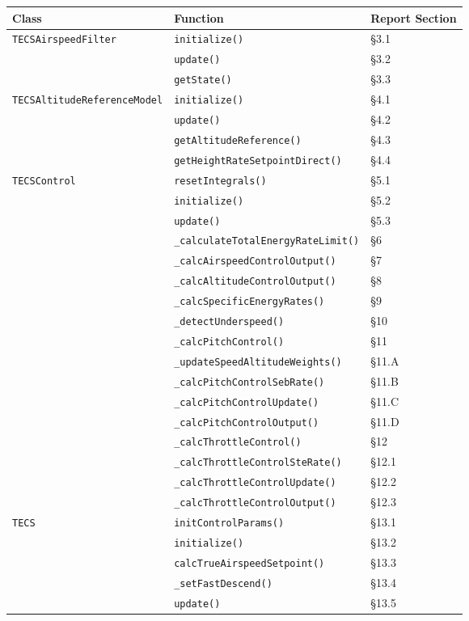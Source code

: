 \documentclass[12pt,a4paper]{article}
\begin{document}
\begin{center}
\begin{tabular}{lll}
\toprule
Class & Function & Report Section \\
\midrule
\texttt{TECSAirspeedFilter} & \texttt{initialize()} & \S3.1 \\
 & \texttt{update()} & \S3.2 \\
 & \texttt{getState()} & \S3.3 \\
\midrule
\texttt{TECSAltitudeReferenceModel} & \texttt{initialize()} & \S4.1 \\
 & \texttt{update()} & \S4.2 \\
 & \texttt{getAltitudeReference()} & \S4.3 \\
 & \texttt{getHeightRateSetpointDirect()} & \S4.4 \\
\midrule
\texttt{TECSControl} & \texttt{resetIntegrals()} & \S5.1 \\
 & \texttt{initialize()} & \S5.2 \\
 & \texttt{update()} & \S5.3 \\
 & \texttt{\_calculateTotalEnergyRateLimit()} & \S6 \\
 & \texttt{\_calcAirspeedControlOutput()} & \S7 \\
 & \texttt{\_calcAltitudeControlOutput()} & \S8 \\
 & \texttt{\_calcSpecificEnergyRates()} & \S9 \\
 & \texttt{\_detectUnderspeed()} & \S10 \\
 & \texttt{\_calcPitchControl()} & \S11 \\
 & \texttt{\_updateSpeedAltitudeWeights()} & \S11.A \\
 & \texttt{\_calcPitchControlSebRate()} & \S11.B \\
 & \texttt{\_calcPitchControlUpdate()} & \S11.C \\
 & \texttt{\_calcPitchControlOutput()} & \S11.D \\
 & \texttt{\_calcThrottleControl()} & \S12 \\
 & \texttt{\_calcThrottleControlSteRate()} & \S12.1 \\
 & \texttt{\_calcThrottleControlUpdate()} & \S12.2 \\
 & \texttt{\_calcThrottleControlOutput()} & \S12.3 \\
\midrule
\texttt{TECS} & \texttt{initControlParams()} & \S13.1 \\
 & \texttt{initialize()} & \S13.2 \\
 & \texttt{calcTrueAirspeedSetpoint()} & \S13.3 \\
 & \texttt{\_setFastDescend()} & \S13.4 \\
 & \texttt{update()} & \S13.5 \\
\bottomrule
\end{tabular}
\end{center}
\end{document}
